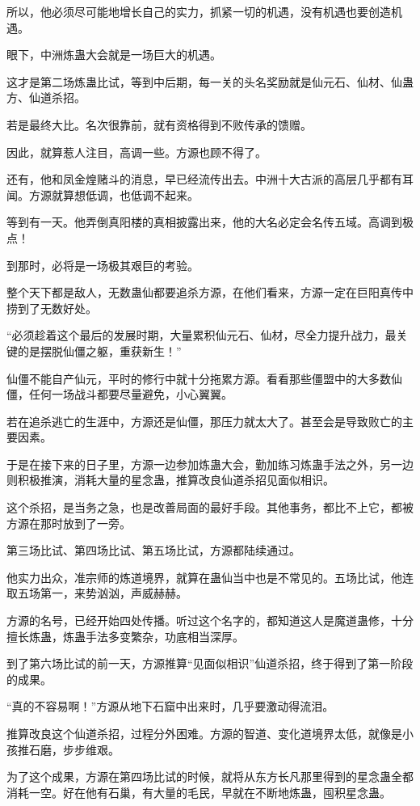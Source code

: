 \begin{this_body}
所以，他必须尽可能地增长自己的实力，抓紧一切的机遇，没有机遇也要创造机遇。

眼下，中洲炼蛊大会就是一场巨大的机遇。

这才是第二场炼蛊比试，等到中后期，每一关的头名奖励就是仙元石、仙材、仙蛊方、仙道杀招。

若是最终大比。名次很靠前，就有资格得到不败传承的馈赠。

因此，就算惹人注目，高调一些。方源也顾不得了。

还有，他和凤金煌赌斗的消息，早已经流传出去。中洲十大古派的高层几乎都有耳闻。方源就算想低调，也低调不起来。

等到有一天。他弄倒真阳楼的真相披露出来，他的大名必定会名传五域。高调到极点！

到那时，必将是一场极其艰巨的考验。

整个天下都是敌人，无数蛊仙都要追杀方源，在他们看来，方源一定在巨阳真传中捞到了无数好处。

“必须趁着这个最后的发展时期，大量累积仙元石、仙材，尽全力提升战力，最关键的是摆脱仙僵之躯，重获新生！”

仙僵不能自产仙元，平时的修行中就十分拖累方源。看看那些僵盟中的大多数仙僵，任何一场战斗都要尽量避免，小心翼翼。

若在追杀逃亡的生涯中，方源还是仙僵，那压力就太大了。甚至会是导致败亡的主要因素。

于是在接下来的日子里，方源一边参加炼蛊大会，勤加练习炼蛊手法之外，另一边则积极推演，消耗大量的星念蛊，推算改良仙道杀招见面似相识。

这个杀招，是当务之急，也是改善局面的最好手段。其他事务，都比不上它，都被方源在那时放到了一旁。

第三场比试、第四场比试、第五场比试，方源都陆续通过。

他实力出众，准宗师的炼道境界，就算在蛊仙当中也是不常见的。五场比试，他连取五场第一，来势汹汹，声威赫赫。

方源的名号，已经开始四处传播。听过这个名字的，都知道这人是魔道蛊修，十分擅长炼蛊，炼蛊手法多变繁杂，功底相当深厚。

到了第六场比试的前一天，方源推算“见面似相识”仙道杀招，终于得到了第一阶段的成果。

“真的不容易啊！”方源从地下石窟中出来时，几乎要激动得流泪。

推算改良这个仙道杀招，过程分外困难。方源的智道、变化道境界太低，就像是小孩推石磨，步步维艰。

为了这个成果，方源在第四场比试的时候，就将从东方长凡那里得到的星念蛊全都消耗一空。好在他有石巢，有大量的毛民，早就在不断地炼蛊，囤积星念蛊。


\end{this_body}
